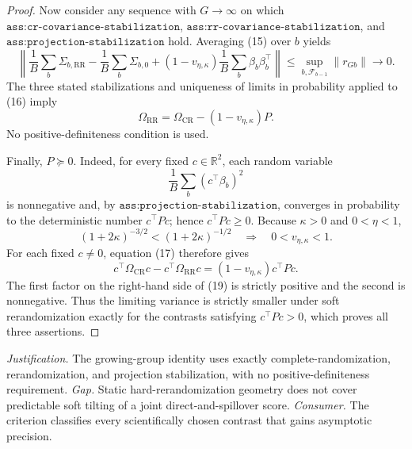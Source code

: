 \documentclass{article}
\begin{document}
\begin{proof}
Now consider any sequence with \(G\to\infty\) on which \(\texttt{ass:cr-covariance-stabilization}\), \(\texttt{ass:rr-covariance-stabilization}\), and \(\texttt{ass:projection-stabilization}\) hold. Averaging (15) over \(b\) yields
\[
\left\|\frac1B\sum_b\Sigma_{b,\mathrm{RR}}
-\frac1B\sum_b\Sigma_{b,0}
+(1-v_{\eta,\kappa})\frac1B\sum_b\beta_b\beta_b^\top\right\|
\leq\sup_{b,\mathcal F_{b-1}}\|r_{Gb}\|\longrightarrow0.                 \tag{16}
\]
The three stated stabilizations and uniqueness of limits in probability applied to (16) imply
\[
\Omega_{\mathrm{RR}}
=\Omega_{\mathrm{CR}}-(1-v_{\eta,\kappa})P.                               \tag{17}
\]
No positive-definiteness condition is used.

Finally, \(P\succeq0\). Indeed, for every fixed \(c\in\mathbb R^2\), each random variable
\[
\frac1B\sum_b(c^\top\beta_b)^2
\]
is nonnegative and, by \(\texttt{ass:projection-stabilization}\), converges in probability to the deterministic number \(c^\top Pc\); hence \(c^\top Pc\geq0\). Because \(\kappa>0\) and \(0<\eta<1\),
\[
(1+2\kappa)^{-3/2}<(1+2\kappa)^{-1/2}
\quad\Longrightarrow\quad
0<v_{\eta,\kappa}<1.                                                       \tag{18}
\]
For each fixed \(c\neq0\), equation (17) therefore gives
\[
c^\top\Omega_{\mathrm{CR}}c-c^\top\Omega_{\mathrm{RR}}c
=(1-v_{\eta,\kappa})c^\top Pc.                                           \tag{19}
\]
The first factor on the right-hand side of (19) is strictly positive and the second is nonnegative. Thus the limiting variance is strictly smaller under soft rerandomization exactly for the contrasts satisfying \(c^\top Pc>0\), which proves all three assertions.
\end{proof}
\par\smallskip\noindent \textit{Justification.} The growing-group identity uses exactly complete-randomization, rerandomization, and projection stabilization, with no positive-definiteness requirement. \textit{Gap.} Static hard-rerandomization geometry does not cover predictable soft tilting of a joint direct-and-spillover score. \textit{Consumer.} The criterion classifies every scientifically chosen contrast that gains asymptotic precision.
\end{document}
